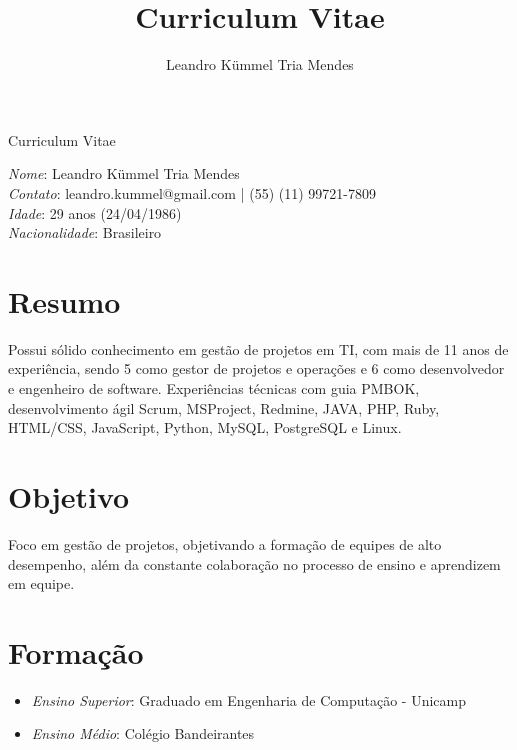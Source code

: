 \documentclass[a4paper,10pt]{article}
\title{Curriculum Vitae}
\author{Leandro Kümmel Tria Mendes}
\begin{document}
\begin{center} 
Curriculum Vitae
\end{center} 
\emph{Nome}: Leandro Kümmel Tria Mendes\\
\emph{Contato}: leandro.kummel@gmail.com | (55) (11) 99721-7809\\
\emph{Idade}: 29 anos (24/04/1986)\\
\emph{Nacionalidade}: Brasileiro\\
\section{Resumo}

  Possui sólido conhecimento em gestão de projetos em TI, com mais de 11 anos de experiência, sendo 5 como gestor de projetos e operações e 6 como desenvolvedor e engenheiro de software. Experiências técnicas com guia PMBOK, desenvolvimento ágil Scrum, MSProject, Redmine, JAVA, PHP, Ruby, HTML/CSS, JavaScript, Python, MySQL, PostgreSQL e Linux.
\section{Objetivo}

  Foco em gestão de projetos, objetivando a formação de equipes de alto desempenho, além da constante colaboração no processo de ensino e aprendizem em equipe. 
\section{Formação}
\begin{itemize}
\item \emph{Ensino Superior}: Graduado em Engenharia de Computação - Unicamp 
\item \emph{Ensino Médio}: Colégio Bandeirantes

\end{itemize}
\end{document}
